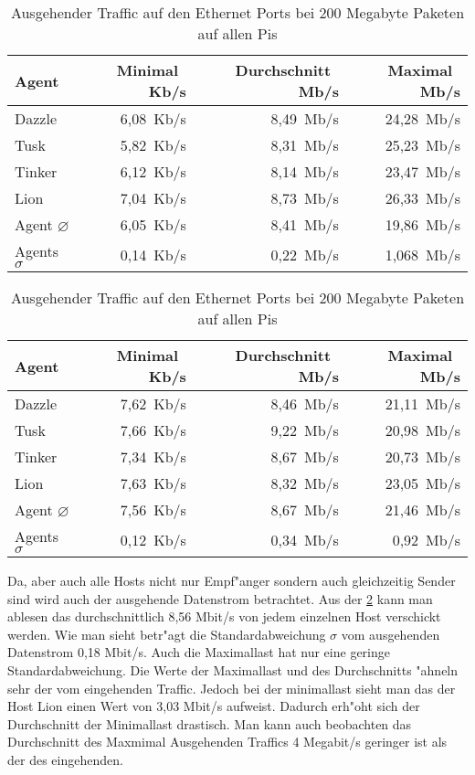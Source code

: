 \begin{table}
\centering
\begin{tabular}{l%
 r<{\,Kb/s}%
 r<{\,Mb/s}%
 r<{\,Mb/s}%
}
Agent  				& Minimal		& Durchschnitt		& Maximal	\\
\hline
Dazzle 				& 6,08			& 8,49 			& 24,28		\\
Tusk 				& 5,82			& 8,31			& 25,23		\\
Tinker				& 6,12			& 8,14			& 23,47		\\
Lion				& 7,04			& 8,73			& 26,33		\\ 
Agent $\diameter $	 	& 6,05			& 8,41			& 19,86		\\   
Agents $\sigma $		& 0,14			& 0,22			& 1,068		\\

\end{tabular}
\caption{Eingehender Traffic auf den Ethernet Ports bei 200 Megabyte Paketen auf allen Pis}
\label{tab:EingehenderTraffic200Mb}
\begin{tabular}{l%
 r<{\,Kb/s}%
 r<{\,Mb/s}%
 r<{\,Mb/s}%
}
Agent  				& Minimal		& Durchschnitt		& Maximal	\\	
\hline
Dazzle 				& 7,62			& 8,46	 		& 21,11		\\
Tusk 				& 7,66			& 9,22			& 20,98		\\
Tinker				& 7,34			& 8,67			& 20,73		\\
Lion				& 7,63			& 8,32			& 23,05		\\ 
Agent $\diameter $	 	& 7,56			& 8,67			& 21,46		\\   
Agents $\sigma $		& 0,12			& 0,34			& 0,92		\\

\end{tabular}
\caption{Ausgehender Traffic auf den Ethernet Ports bei 200 Megabyte Paketen auf allen Pis}
\label{tab:AusgehenderTraffic200Mb}

\end{table}

Da, aber auch alle Hosts nicht nur Empf"anger sondern auch gleichzeitig Sender sind wird auch der ausgehende %
Datenstrom betrachtet. Aus der \cref{tab:AusgehenderTraffic200Mb} kann man ablesen das durchschnittlich %
8,56 Mbit/s von jedem einzelnen Host verschickt werden. Wie man sieht betr"agt die Standardabweichung %
$\sigma$ vom ausgehenden Datenstrom 0,18 Mbit/s. Auch die Maximallast hat nur eine geringe Standardabweichung. %
Die Werte der Maximallast und des Durchschnitts "ahneln sehr der vom eingehenden Traffic. %
Jedoch bei der minimallast sieht man das der Host Lion einen Wert von 3,03 Mbit/s aufweist. %
Dadurch erh"oht sich der Durchschnitt der Minimallast drastisch. Man kann auch beobachten %
das Durchschnitt des Maxmimal Ausgehenden Traffics 4 Megabit/s geringer ist als der des eingehenden. %

